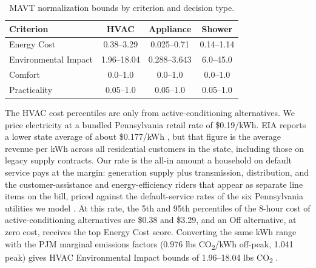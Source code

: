 \documentclass[final,3p,times]{elsarticle}
\begin{document}
\begin{table}[htbp]
\caption{MAVT normalization bounds by criterion and decision type.}
\label{table:reference_ranges}
\centering
\begin{threeparttable}
\centering
\small
\begin{tabular}{@{}lccc@{}}
\toprule
\textbf{Criterion} & \textbf{HVAC} & \textbf{Appliance} & \textbf{Shower} \\
\midrule
Energy Cost & 0.38--3.29 & 0.025--0.71 & 0.14--1.14 \\
Environmental Impact & 1.96--18.04 & 0.288--3.643 & 6.0--45.0 \\
Comfort & 0.0--1.0 & 0.0--1.0 & 0.0--1.0 \\
Practicality & 0.05--1.0 & 0.05--1.0 & 0.05--1.0 \\
\bottomrule
\end{tabular}
\end{threeparttable}
\end{table}
The HVAC cost percentiles are only from active-conditioning alternatives. We price electricity at a bundled Pennsylvania retail rate of \$0.19/kWh. EIA reports a lower state average of about \$0.177/kWh \cite{eia_epa_2024}, but that figure is the average revenue per kWh across all residential customers in the state, including those on legacy supply contracts. Our rate is the all-in amount a household on default service pays at the margin: generation supply plus transmission, distribution, and the customer-assistance and energy-efficiency riders that appear as separate line items on the bill, priced against the default-service rates of the six Pennsylvania utilities we model \cite{paupc2025}. At this rate, the 5th and 95th percentiles of the 8-hour cost of active-conditioning alternatives are \$0.38 and \$3.29, and an Off alternative, at zero cost, receives the top Energy Cost score. Converting the same kWh range with the PJM marginal emissions factors (0.976 lbs CO\textsubscript{2}/kWh off-peak, 1.041 peak) gives HVAC Environmental Impact bounds of 1.96--18.04 lbs CO\textsubscript{2} \cite{pjm2022emissions}.
\end{document}
